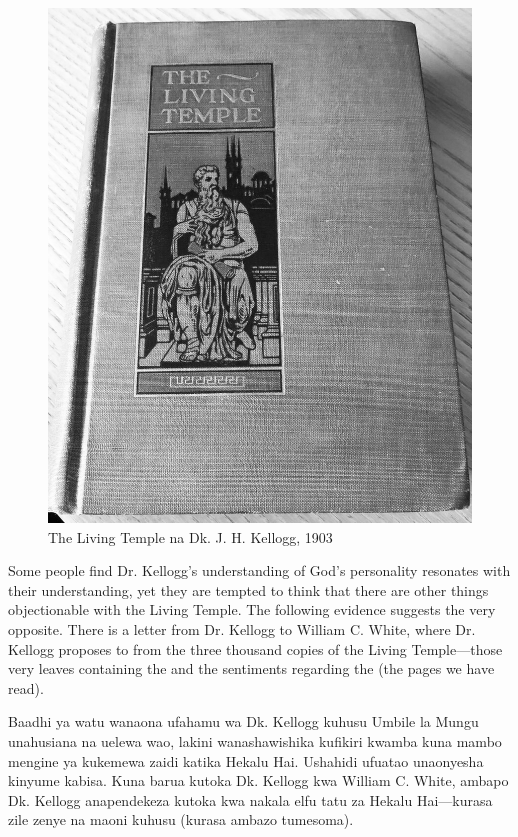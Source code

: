 \begin{figure}[hp]
    \centering
    \includegraphics[width=1\linewidth]{images/TLT.jpg}
    \caption*{The Living Temple na Dk. J. H. Kellogg, 1903}
    \label{fig:tlt}
\end{figure}


Some people find Dr. Kellogg’s understanding of God’s personality resonates with their understanding, yet they are tempted to think that there are other things objectionable with the Living Temple. The following evidence suggests the very opposite. There is a letter from Dr. Kellogg to William C. White, where Dr. Kellogg proposes to  from the three thousand copies of the Living Temple—those very leaves containing the  and the sentiments regarding the  (the pages we have read).


Baadhi ya watu wanaona ufahamu wa Dk. Kellogg kuhusu Umbile la Mungu unahusiana na uelewa wao, lakini wanashawishika kufikiri kwamba kuna mambo mengine ya kukemewa zaidi katika Hekalu Hai. Ushahidi ufuatao unaonyesha kinyume kabisa. Kuna barua kutoka Dk. Kellogg kwa William C. White, ambapo Dk. Kellogg anapendekeza  kutoka kwa nakala elfu tatu za Hekalu Hai—kurasa zile zenye  na maoni kuhusu  (kurasa ambazo tumesoma).


